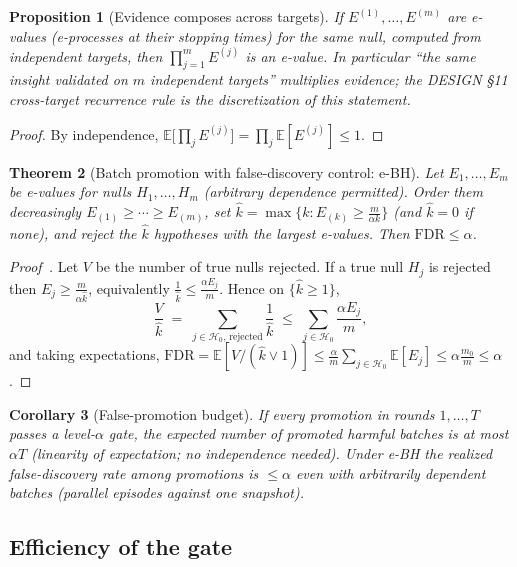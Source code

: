 \documentclass[11pt]{article}
\theoremstyle{plain}
\newtheorem{theorem}{Theorem}[section]
\newtheorem{proposition}[theorem]{Proposition}
\newtheorem{corollary}[theorem]{Corollary}
\theoremstyle{definition}
\theoremstyle{remark}
\newcommand{\E}{\mathbb{E}}
\newcommand{\cH}{\mathcal{H}}
\begin{document}
\begin{proposition}[Evidence composes across targets]\label{prop:eproduct}
If $E^{(1)}, \dots, E^{(m)}$ are e-values (e-processes at their stopping
times) for the same null, computed from \emph{independent} targets, then
$\prod_{j=1}^m E^{(j)}$ is an e-value. In particular ``the same insight
validated on $m$ independent targets'' multiplies evidence; the DESIGN
\S11 cross-target recurrence rule is the discretization of this statement.
\end{proposition}

\begin{proof}
By independence, $\E\bigl[\prod_j E^{(j)}\bigr] = \prod_j \E[E^{(j)}] \le 1$.
\end{proof}

\begin{theorem}[Batch promotion with false-discovery control: e-BH]
\label{thm:ebh}
Let $E_1, \dots, E_m$ be e-values for nulls $H_1, \dots, H_m$ (\emph{arbitrary
dependence} permitted). Order them decreasingly $E_{(1)} \ge \cdots \ge
E_{(m)}$, set $\hat k = \max\{k : E_{(k)} \ge \tfrac{m}{\alpha k}\}$ (and
$\hat k = 0$ if none), and reject the $\hat k$ hypotheses with the largest
e-values. Then $\mathrm{FDR} \le \alpha$.
\end{theorem}

\begin{proof}[Proof~\cite{ebh}]
Let $V$ be the number of true nulls rejected. If a true null $H_j$ is
rejected then $E_j \ge \frac{m}{\alpha \hat k}$, equivalently
$\frac{1}{\hat k} \le \frac{\alpha E_j}{m}$. Hence on $\{\hat k \ge 1\}$,
\[
  \frac{V}{\hat k}
  \;=\; \sum_{j \in \cH_0,\, \text{rejected}} \frac{1}{\hat k}
  \;\le\; \sum_{j \in \cH_0} \frac{\alpha E_j}{m},
\]
and taking expectations, $\mathrm{FDR} = \E[V / (\hat k \vee 1)] \le
\frac{\alpha}{m} \sum_{j \in \cH_0} \E[E_j] \le \alpha \frac{m_0}{m} \le
\alpha$.
\end{proof}

\begin{corollary}[False-promotion budget]\label{cor:falseprom}
If every promotion in rounds $1, \dots, T$ passes a level-$\alpha$ gate, the
expected number of promoted harmful batches is at most $\alpha T$ (linearity
of expectation; no independence needed). Under e-BH the realized
false-discovery \emph{rate} among promotions is $\le \alpha$ even with
arbitrarily dependent batches (parallel episodes against one snapshot).
\end{corollary}

\subsection{Efficiency of the gate}
\end{document}
